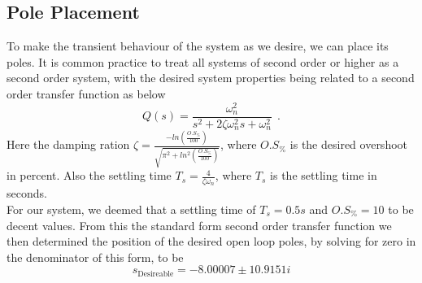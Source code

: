 \documentclass[a4paper,onecolumn,amsmath,amssymb]{revtex4-1}
\begin{document}
\subsection{\textbf{Pole Placement}}
To make the transient behaviour of the system as we desire, we can place its poles. It is common practice to treat all systems of second order or higher as a second order system, with the desired system properties being related to a second order transfer function as below\\
\begin{equation}
Q(s)=\frac{\omega_n^2 }{s^2+2\zeta \omega_n ^2 s +\omega_n ^2 }~~.
\end{equation}
Here the damping ration $\zeta=\frac{-ln(\frac{O.S_{\%}}{100})}{\sqrt{\pi ^2 +ln^2(\frac{O.S_{\%}}{100})}}$, where $O.S_{\%}$ is the desired overshoot in percent. Also the settling time $T_s=\frac{4 }{\zeta\omega_n}$, where $T_s$ is the settling time in seconds.\\

For our system, we deemed that a settling time of $T_s=0.5s$ and $O.S_{\%}=10$ to be decent values.  From this the standard form second order transfer function we then determined the position of the desired open loop poles, by solving for zero in the denominator of this form, to be\\
\begin{equation}
s_{\text{Desireable}}=-8.00007\pm10.9151 i
\end{equation}
\end{document}
